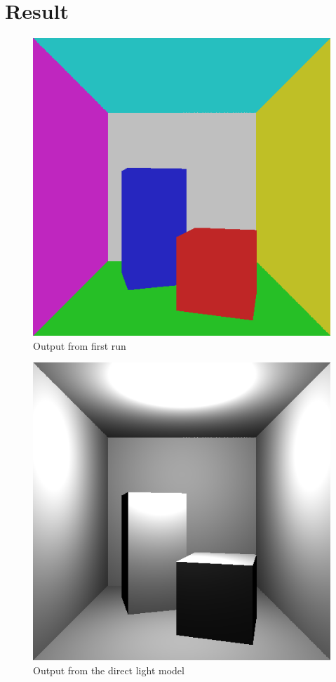 \documentclass[a4paper,11pt]{article}
\begin{document}
\section{Result}

\begin{figure}[h!]
	\centering
	\includegraphics[width=0.75\linewidth]{screenshot1.png}
	\caption{Output from first run}
	\label{fig1}
\end{figure}

\begin{figure}[h!]
	\centering
	\includegraphics[width=0.75\linewidth]{screenshot2.png}
	\caption{Output from the direct light model}
	\label{fig2}
\end{figure}
\end{document}
